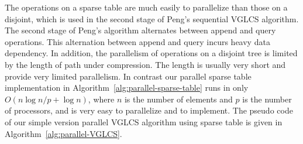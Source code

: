 


The operations on a sparse table are much easily to parallelize than
those on a disjoint, which is used in the second stage of Peng's
sequential VGLCS algorithm.  The second stage of Peng's algorithm
alternates between append and query operations.  This alternation
between append and query incurs heavy data dependency.  In addition,
the parallelism of operations on a disjoint tree is limited by the
length of path under compression.  The length is usually very short
and provide very limited parallelism.  In contrast our parallel sparse
table implementation in Algorithm~\ref{alg:parallel-sparse-table} runs
in only $O(n \log n / p + \log n)$, where $n$ is the number of
elements and $p$ is the number of processors, and is very easy to
parallelize and to implement.  The pseudo code of our simple version
parallel VGLCS algorithm using sparse table is given in
Algorithm~\ref{alg:parallel-VGLCS}.


